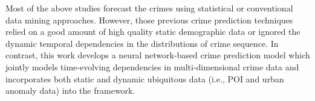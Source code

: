 \noindent Most of the above studies forecast the crimes using statistical
or conventional data mining approaches. However, those previous
crime prediction techniques relied on a good amount of high quality
static demographic data or ignored the dynamic temporal dependencies in the 
distributions of crime sequence. In contrast, this work
develops a neural network-based crime prediction model which
jointly models time-evolving dependencies in multi-dimensional
crime data and incorporates both static and dynamic ubiquitous
data (i.e., POI and urban anomaly data) into the framework.




